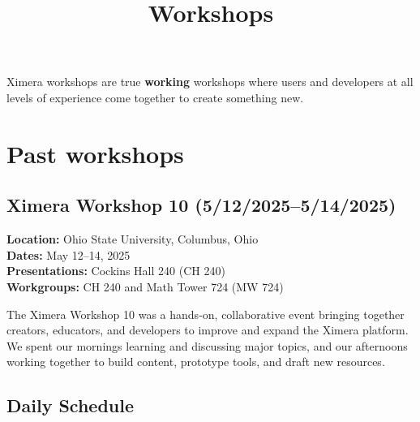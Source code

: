 \documentclass{ximera}
\title{Workshops}
\begin{document}
\begin{abstract}
\end{abstract}
\maketitle

Ximera workshops are true \textbf{working} workshops where users and developers at all levels of experience come together to create something new.

\section*{Past workshops}


\subsection*{Ximera Workshop 10 (5/12/2025--5/14/2025)}

\textbf{Location:} Ohio State University, Columbus, Ohio\\
\textbf{Dates:} May 12--14, 2025\\
\textbf{Presentations:} Cockins Hall 240 (CH 240)\\
\textbf{Workgroups:} CH 240 and Math Tower 724 (MW 724)

The Ximera Workshop 10 was a hands-on, collaborative event bringing together creators, educators, and developers to improve and expand the Ximera platform. 
%
We spent our mornings learning and discussing major topics, and our afternoons working together to build content, prototype tools, and draft new resources.

\subsection*{Daily Schedule}
\end{document}
